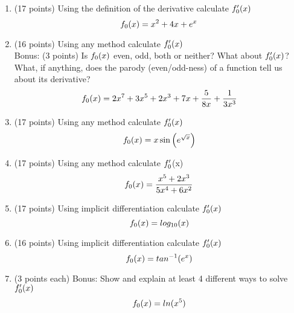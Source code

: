 \documentclass[11pt]{article}
\begin{document}
	\newpage
	\begin{enumerate}
		\item  (17 points) Using the definition of the derivative calculate $f'_{\number\value{enumi}}(x)$\\
		$$f_{\number\value{enumi}}(x) = x^2 + 4 x + e^x$$
		\newpage
		\item  (16 points) Using any method calculate $f'_{\number\value{enumi}}(x)$\\
		Bonus: (3 points) Is $f_{\number\value{enumi}}(x)$ even, odd, both or neither? What about $f'_{\number\value{enumi}}(x)$?  What, if anything, does the parody (even/odd-ness) of a function tell us about its derivative? 
		$$f_{\number\value{enumi}}(x) = 2 x^7 + 3 x^5 + 2 x^3 + 7 x + \frac{5}{8 x} + \frac{1}{3 x^3}$$
		\newpage
		\item  (17 points) Using any method calculate $f'_{\number\value{enumi}}(x)$\\ $$f_{\number\value{enumi}}(x) = x \sin\left(e^{\sqrt{x}}\right)$$
		\newpage
		\item  (17 points) Using any method calculate $f'_{\number\value{enumi}}$(x)\\
		$$f_{\number\value{enumi}}(x) = \frac{x^5 + 2x^3}{5 x^4 + 6 x^2}$$
		\newpage
		\item  (17 points) Using implicit differentiation calculate $f'_{\number\value{enumi}}(x)$\\
		$$f_{\number\value{enumi}}(x) = log_{10}(x)$$
		\newpage
		\item  (16 points) Using implicit differentiation calculate $f'_{\number\value{enumi}}(x)$\\
		$$f_{\number\value{enumi}}(x) = tan^{-1}(e^x)$$
		\newpage
		\item  (3 points each) Bonus:  Show and explain at least 4 different ways to solve $f'_{\number\value{enumi}}(x)$\\
		$$f_{\number\value{enumi}}(x) = ln(x^5)$$
	\end{enumerate}
	
\end{document}
